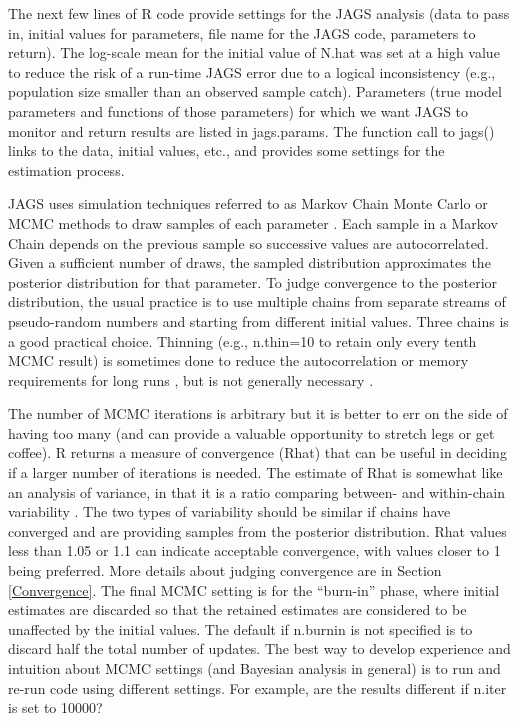 \documentclass[
]{krantz}
\begin{document}
The next few lines of R code provide settings for the JAGS analysis (data to pass in, initial values for parameters, file name for the JAGS code, parameters to return). The log-scale mean for the initial value of N.hat was set at a high value to reduce the risk of a run-time JAGS error due to a logical inconsistency (e.g., population size smaller than an observed sample catch). Parameters (true model parameters and functions of those parameters) for which we want JAGS to monitor and return results are listed in jags.params. The function call to jags() links to the data, initial values, etc., and provides some settings for the estimation process.

JAGS uses simulation techniques referred to as Markov Chain Monte Carlo or MCMC methods to draw samples of each parameter \citep{mccarthy_2007, kéry.schaub_2012}. Each sample in a Markov Chain depends on the previous sample so successive values are autocorrelated. Given a sufficient number of draws, the sampled distribution approximates the posterior distribution for that parameter. To judge convergence to the posterior distribution, the usual practice is to use multiple chains from separate streams of pseudo-random numbers and starting from different initial values. Three chains is a good practical choice. Thinning (e.g., n.thin=10 to retain only every tenth MCMC result) is sometimes done to reduce the autocorrelation or memory requirements for long runs \citep{gelman.hill_2007}, but is not generally necessary \citep{link.eaton2012}.

The number of MCMC iterations is arbitrary but it is better to err on the side of having too many (and can provide a valuable opportunity to stretch legs or get coffee). R returns a measure of convergence (Rhat) that can be useful in deciding if a larger number of iterations is needed. The estimate of Rhat is somewhat like an analysis of variance, in that it is a ratio comparing between- and within-chain variability \citep{kéry.schaub_2012}. The two types of variability should be similar if chains have converged and are providing samples from the posterior distribution. Rhat values less than 1.05 \citep{lunn.etal_2012} or 1.1 \citep{gelman.hill_2007} can indicate acceptable convergence, with values closer to 1 being preferred. More details about judging convergence are in Section \ref{Convergence}. The final MCMC setting is for the ``burn-in'' phase, where initial estimates are discarded so that the retained estimates are considered to be unaffected by the initial values. The default if n.burnin is not specified is to discard half the total number of updates. The best way to develop experience and intuition about MCMC settings (and Bayesian analysis in general) is to run and re-run code using different settings. For example, are the results different if n.iter is set to 10000?
\end{document}
